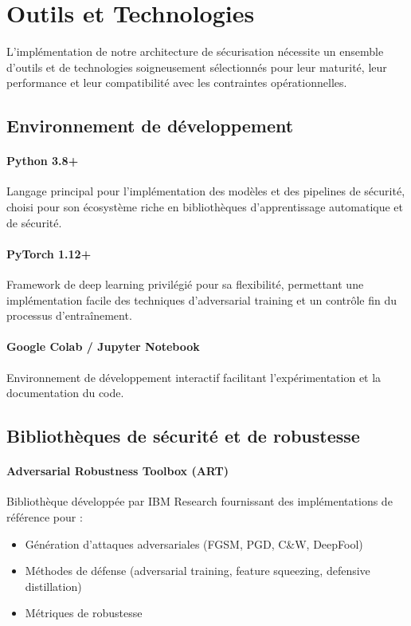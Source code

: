 \section{Outils et Technologies}

L'implémentation de notre architecture de sécurisation nécessite un ensemble d'outils et de technologies soigneusement sélectionnés pour leur maturité, leur performance et leur compatibilité avec les contraintes opérationnelles.

\subsection{Environnement de développement}

\paragraph{Python 3.8+}
Langage principal pour l'implémentation des modèles et des pipelines de sécurité, choisi pour son écosystème riche en bibliothèques d'apprentissage automatique et de sécurité.

\paragraph{PyTorch 1.12+}
Framework de deep learning privilégié pour sa flexibilité, permettant une implémentation facile des techniques d'adversarial training et un contrôle fin du processus d'entraînement.

\paragraph{Google Colab / Jupyter Notebook}
Environnement de développement interactif facilitant l'expérimentation et la documentation du code.

\subsection{Bibliothèques de sécurité et de robustesse}

\paragraph{Adversarial Robustness Toolbox (ART)}
Bibliothèque développée par IBM Research fournissant des implémentations de référence pour :
\begin{itemize}
    \item Génération d'attaques adversariales (FGSM, PGD, C\&W, DeepFool)
    \item Méthodes de défense (adversarial training, feature squeezing, defensive distillation)
    \item Métriques de robustesse
\end{itemize}

